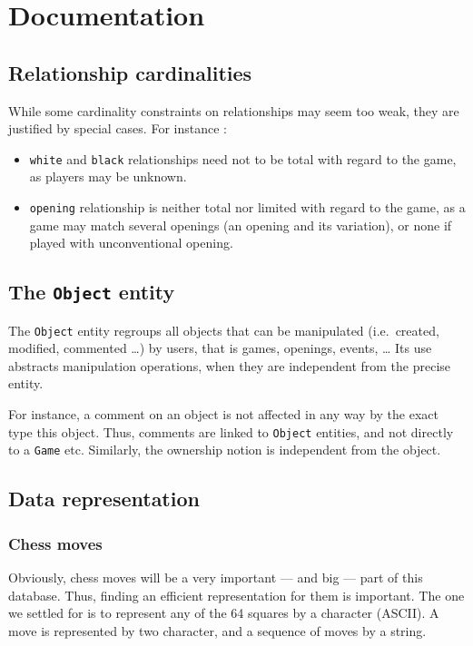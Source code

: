 \documentclass{article}
\begin{document}
\section{Documentation}
\subsection{}

\subsection{Relationship cardinalities}
While some cardinality constraints on relationships may seem too weak,
they are justified by special cases. For instance :
\begin{itemize}
\item \verb|white| and \verb|black| relationships need not to be total with regard to the game, as players may be unknown.

\item \verb|opening| relationship is neither total nor limited with regard to the game,
as a game may match several openings (an opening and its variation), or none if played with unconventional opening.
\end{itemize}

\subsection{The \texttt{Object} entity}
The \verb|Object| entity regroups all objects that can be manipulated (i.e.\ created, modified, commented \dots) by users,
that is games, openings, events, \dots
Its use abstracts manipulation operations, when they are independent from the precise entity.

For instance, a comment on an object is not affected in any way by the exact type this object.
Thus, comments are linked to \verb|Object| entities, and not directly to a \verb|Game| etc.
Similarly, the ownership notion is independent from the object.

\subsection{Data representation}
\subsubsection{Chess moves}
Obviously, chess moves will be a very important --- and big --- part of this database.
Thus, finding an efficient representation for them is important.
The one we settled for is to represent any of the 64 squares by a character (ASCII).
A move is represented by two character, and a sequence of moves by a string.
\end{document}
